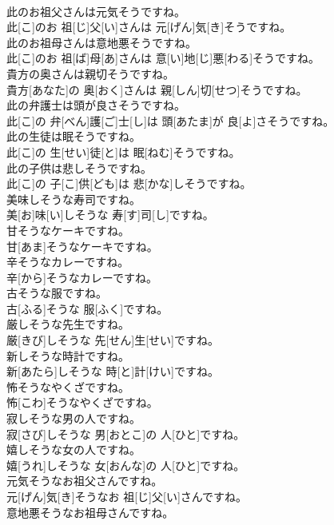 \documentclass[8pt]{extreport}
\begin{document}
\begin{CJK}{UTF8}{min}
\\	此のお祖父さんは元気そうですね。	
\\	此[こ]のお 祖[じ]父[い]さんは 元[げん]気[き]そうですね。
\\	此のお祖母さんは意地悪そうですね。	
\\	此[こ]のお 祖[ば]母[あ]さんは 意[い]地[じ]悪[わる]そうですね。
\\	貴方の奥さんは親切そうですね。	
\\	貴方[あなた]の 奥[おく]さんは 親[しん]切[せつ]そうですね。
\\	此の弁護士は頭が良さそうですね。	
\\	此[こ]の 弁[べん]護[ご]士[し]は 頭[あたま]が 良[よ]さそうですね。
\\	此の生徒は眠そうですね。	
\\	此[こ]の 生[せい]徒[と]は 眠[ねむ]そうですね。
\\	此の子供は悲しそうですね。	
\\	此[こ]の 子[こ]供[ども]は 悲[かな]しそうですね。
\\	美味しそうな寿司ですね。	
\\	美[お]味[い]しそうな 寿[す]司[し]ですね。
\\	甘そうなケーキですね。	
\\	甘[あま]そうなケーキですね。
\\	辛そうなカレーですね。	
\\	辛[から]そうなカレーですね。
\\	古そうな服ですね。	
\\	古[ふる]そうな 服[ふく]ですね。
\\	厳しそうな先生ですね。	
\\	厳[きび]しそうな 先[せん]生[せい]ですね。
\\	新しそうな時計ですね。	
\\	新[あたら]しそうな 時[と]計[けい]ですね。
\\	怖そうなやくざですね。	
\\	怖[こわ]そうなやくざですね。
\\	寂しそうな男の人ですね。	
\\	寂[さび]しそうな 男[おとこ]の 人[ひと]ですね。
\\	嬉しそうな女の人ですね。	
\\	嬉[うれ]しそうな 女[おんな]の 人[ひと]ですね。
\\	元気そうなお祖父さんですね。	
\\	元[げん]気[き]そうなお 祖[じ]父[い]さんですね。
\\	意地悪そうなお祖母さんですね。	

\end{CJK}
\end{document}

